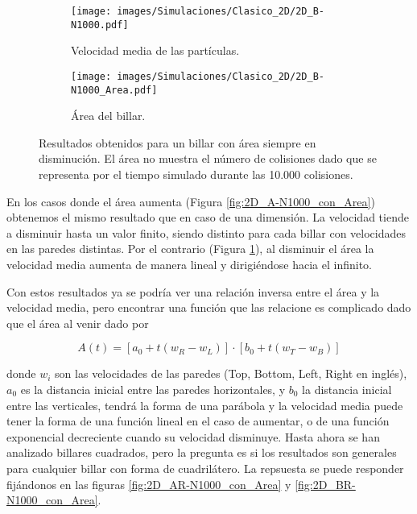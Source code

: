 \documentclass[11pt, spanish]{book}
\begin{document}
\begin{figure}[h]
    \begin{subfigure}[b]{0.5\textwidth}
        \centering
        \texttt{[image: images/Simulaciones/Clasico\_2D/2D\_B-N1000.pdf]}
        \caption{Velocidad media de las partículas.}
    \end{subfigure}
    \hfill
    \begin{subfigure}[b]{0.5\textwidth}
        \centering
        \texttt{[image: images/Simulaciones/Clasico\_2D/2D\_B-N1000\_Area.pdf]}
        \caption{Área del billar.}
    \end{subfigure}
    \caption{Resultados obtenidos para un billar con área siempre en disminución. El área no muestra el número de colisiones dado que se representa por el tiempo simulado durante las 10.000 colisiones.}
    \label{fig:2D_B-N1000_con_Area}
\end{figure}

En los casos donde el área aumenta (Figura \ref{fig:2D_A-N1000_con_Area}) obtenemos el mismo resultado que en caso de una dimensión. La velocidad tiende a disminuir hasta un valor finito, siendo distinto para cada billar con velocidades en las paredes distintas. Por el contrario (Figura \ref{fig:2D_B-N1000_con_Area}), al disminuir el área la velocidad media aumenta de manera lineal y dirigiéndose hacia el infinito. 

\vspace{3mm}

Con estos resultados ya se podría ver una relación inversa entre el área y la velocidad media, pero encontrar una función que las relacione es complicado dado que el área al venir dado por 

\begin{equation}\label{eq:area}
    A(t) = \left[ a_0 + t (w_R - w_L) \right] \cdot \left[ b_0 + t (w_T - w_B) \right]
\end{equation}

donde \( w_i \) son las velocidades de las paredes (Top, Bottom, Left, Right en inglés), \( a_0 \) es la distancia inicial entre las paredes horizontales, y \( b_0 \) la distancia inicial entre las verticales, tendrá la forma de una parábola y la velocidad media puede tener la forma de una función lineal en el caso de aumentar, o de una función exponencial decreciente cuando su velocidad disminuye. Hasta ahora se han analizado billares cuadrados, pero la pregunta es si los resultados son generales para cualquier billar con forma de cuadrilátero. La repsuesta se puede responder fijándonos en las figuras \ref{fig:2D_AR-N1000_con_Area} y \ref{fig:2D_BR-N1000_con_Area}. 
\end{document}

